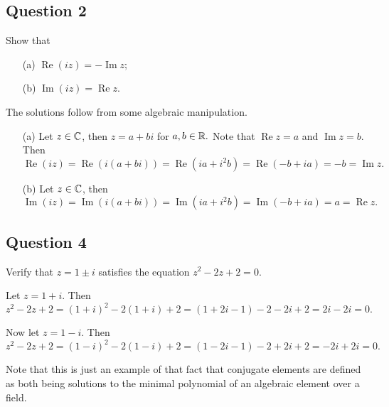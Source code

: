 \subsection{Question 2}
\begin{prob}
    Show that 
    \begin{enumerate}
        \item[(a)] $\operatorname{Re}(iz)= - \operatorname{Im}z;$
        \item[(b)] $\operatorname{Im}(iz) = \operatorname{Re}z.$
    \end{enumerate}
\end{prob}
\begin{solution}
    The solutions follow from some algebraic manipulation. 
    \begin{enumerate}
        \item[(a)] Let $z \in \mathbb{C}$, then $z = a+bi$ for $a,b \in \mathbb{R}.$ Note that $\operatorname{Re}z=a$ and $\operatorname{Im}z = b.$ Then $\operatorname{Re}(iz) = \operatorname{Re}(i(a+bi))=\operatorname{Re}(ia+i^2b)=\operatorname{Re}(-b+ia)=-b=\operatorname{Im}z.$ 
        \item[(b)] Let $z \in \mathbb{C}$, then $\operatorname{Im}(iz)=\operatorname{Im}(i(a+bi))=\operatorname{Im}(ia+i^2b)=\operatorname{Im}(-b+ia)=a=\operatorname{Re}z.$
    \end{enumerate}
\end{solution}

\subsection{Question 4}
\begin{prob}
    Verify that $z=1 \pm i$ satisfies the equation $z^2-2z+2=0.$
\end{prob}
\begin{solution}
    Let $z = 1+i.$ Then $z^2-2z+2=(1+i)^2-2(1+i)+2=(1+2i-1)-2-2i+2=2i-2i=0.$ 
    
    Now let $z=1-i.$ Then $z^2-2z+2=(1-i)^2-2(1-i)+2=(1-2i-1)-2+2i+2=-2i+2i=0.$

    Note that this is just an example of that fact that conjugate elements are defined as both being solutions to the minimal polynomial of an algebraic element over a field.
\end{solution}

